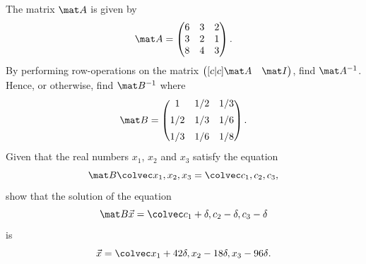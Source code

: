\begin{problem}
    The matrix $\mat A$ is given by \[\mat A = \begin{pmatrix}6 & 3 & 2 \\ 3 & 2 & 1 \\ 8 & 4 & 3\end{pmatrix}.\] By performing row-operations on the matrix $\begin{pmatrix}[c|c] \mat A & \mat I\end{pmatrix}$, find $\mat A^{-1}$. Hence, or otherwise, find $\mat B^{-1}$ where \[\mat B = \begin{pmatrix}1 & 1/2 & 1/3 \\[0.5em] 1/2 & 1/3 & 1/6 \\[0.5em] 1/3 & 1/6 & 1/8\end{pmatrix}.\] Given that the real numbers $x_1$, $x_2$ and $x_3$ satisfy the equation \[\mat B \cveciii{x_1}{x_2}{x_3} = \cveciii{c_1}{c_2}{c_3},\] show that the solution of the equation \[\mat B \vec x = \cveciii{c_1 + \de}{c_2 - \de}{c_3 - \de}\] is \[\vec x = \cveciii{x_1 + 42\de}{x_2 - 18\de}{x_3 - 96\de}.\]
\end{problem}

